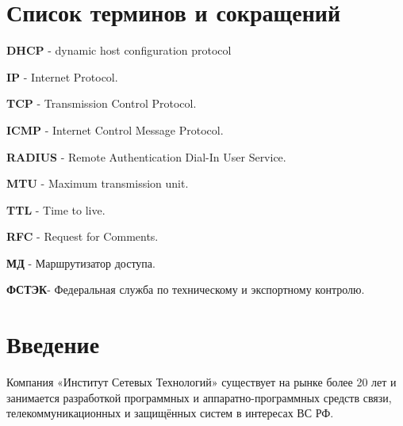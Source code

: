 \documentclass[14pt,a4paper]{extarticle}
\begin{document}
\renewcommand{\refname}{Список использованных источников}

\setcounter{page}{7}

\pagebreak
\tableofcontents

\pagebreak
\section*{Список терминов и сокращений}

\textbf{DHCP} - dynamic host configuration protocol

\textbf{IP} - Internet Protocol.

\textbf{TCP} - Transmission Control Protocol.

\textbf{ICMP} - Internet Control Message Protocol.

\textbf{RADIUS} - Remote Authentication Dial-In User Service.

\textbf{MTU} - Maximum transmission unit.

\textbf{TTL} - Time to live.

\textbf{RFC} - Request for Comments.

\textbf{МД} - Маршрутизатор доступа.

\textbf{ФСТЭК}- Федеральная служба по техническому и экспортному контролю.


\pagebreak
\section*{Введение}


Компания «Институт Сетевых Технологий» существует на рынке более 20 лет и
занимается разработкой программных и аппаратно-программных средств связи,  телекоммуникационных и защищённых систем в интересах ВС РФ.
\end{document}
